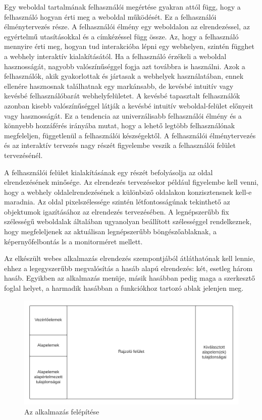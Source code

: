 
Egy weboldal tartalmának felhasználói megértése gyakran attól függ, hogy a felhasználó hogyan érti meg a weboldal működését. Ez a felhasználói élménytervezés része. A felhasználói élmény  egy weboldalon az elrendezéssel, az egyértelmű utasításokkal és a címkézéssel függ össze. Az, hogy a felhasználó mennyire érti meg, hogyan tud interakcióba lépni egy webhelyen, szintén függhet a webhely interaktív kialakításától. Ha a felhasználó érzékeli a weboldal hasznosságát, nagyobb valószínűséggel fogja azt továbbra is használni. Azok a felhasználók, akik gyakorlottak és jártasak a webhelyek használatában, ennek ellenére hasznosnak találhatnak egy markánsabb, de kevésbé intuitív vagy kevésbé felhasználóbarát webhelyfelületet. A kevésbé tapasztalt felhasználók azonban kisebb valószínűséggel látják a kevésbé intuitív weboldal-felület előnyeit vagy hasznosságát. Ez a tendencia az univerzálisabb felhasználói élmény és a könnyebb hozzáférés irányába mutat, hogy a lehető legtöbb felhasználónak megfeleljen, függetlenül a felhasználói készségektől. A felhasználói élménytervezés és az interaktív tervezés nagy részét figyelembe veszik a felhasználói felület tervezésénél.


A felhasználói felület kialakításának egy részét befolyásolja az oldal elrendezésének minősége. Az elrendezés tervezésekor például figyelembe kell venni, hogy a webhely oldalelrendezésének a különböző oldalakon konzisztensnek kell-e maradnia. Az oldal pixelszélessége szintén létfontosságúnak tekinthető az objektumok igazításához az elrendezés tervezésében. A legnépszerűbb fix szélességű weboldalak általában ugyanolyan beállított szélességgel rendelkeznek, hogy megfeleljenek az aktuálisan legnépszerűbb böngészőablaknak, a képernyőfelbontás ls a monitorméret mellett.

Az elkészült webes alkalmazás elrendezés szempontjából átláthatónak kell lennie, ehhez a legegyszerűbb megvalósítás a hasáb alapú elrendezés: két, esetleg három hasáb. Egyikben az alkalmazás menüje, másik hasábban pedig maga a szerkesztő foglal helyet, a harmadik hasábban a funkciókhoz tartozó ablak jelenjen meg. 

\begin{figure}[!h]
	\label{fig:block}
	\includegraphics[width=\textwidth]{images/block.png}
	\caption{Az alkalmazás felépítése}
\end{figure}

